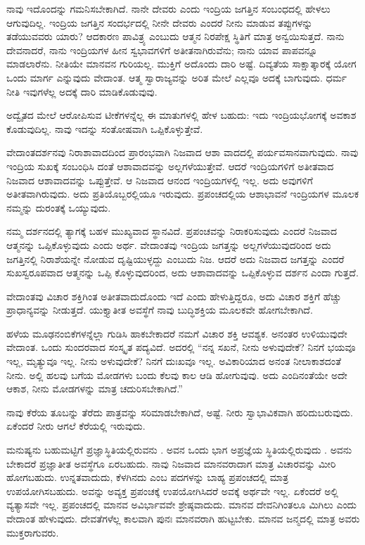 ನಾವು ಇದೊಂದನ್ನು ಗಮನಿಸಬೇಕಾಗಿದೆ. ನಾನೇ ದೇವರು ಎಂದು ಇಂದ್ರಿಯ ಜಗತ್ತಿನ ಸಂಬಂಧದಲ್ಲಿ ಹೇಳಲು ಆಗುವುದಿಲ್ಲ. ಇಂದ್ರಿಯ ಜಗತ್ತಿನ ಸಂದರ್ಭದಲ್ಲಿ ನೀನೇ ದೇವರು ಎಂದರೆ ನೀನು ಮಾಡುವ ತಪ್ಪುಗಳನ್ನು ತಡೆಯುವವರು ಯಾರು? ಆದಕಾರಣ ಪಾವಿತ್ರ್ಯ ಎಂಬುದು ಆತ್ಮನ ನಿರಪೇಕ್ಷ ಸ್ಥಿತಿಗೆ ಮಾತ್ರ ಅನ್ವಯಿಸುತ್ತದೆ. ನಾನು ದೇವನಾದರೆ, ನಾನು ಇಂದ್ರಿಯಗಳ ಹೀನ ಸ್ವಭಾವಗಳಿಗೆ ಅತೀತನಾಗಿರುವೆನು; ನಾನು ಯಾವ ಪಾಪವನ್ನೂ ಮಾಡಲಾರೆನು. ನೀತಿಯೇ ಮಾನವನ ಗುರಿಯಲ್ಲ. ಮುಕ್ತಿಗೆ ಅದೊಂದು ದಾರಿ ಅಷ್ಟೆ. ದಿವ್ಯತೆಯ ಸಾಕ್ಷಾತ್ಕಾರಕ್ಕೆ ಯೋಗ ಒಂದು ಮಾರ್ಗ ಎನ್ನುವುದು ವೇದಾಂತ. ಆತ್ಮ ಸ್ವಾರಾಜ್ಯವನ್ನು ಅರಿತ ಮೇಲೆ ಎಲ್ಲವೂ ಅದಕ್ಕೆ ಬಾಗುವುದು. ಧರ್ಮ ನೀತಿ ಇವುಗಳೆಲ್ಲ ಅದಕ್ಕೆ ದಾರಿ ಮಾಡಿಕೊಡುವುವು.

ಅದ್ವೈತದ ಮೇಲೆ ಆರೋಪಿಸುವ ಟೀಕೆಗಳನ್ನೆಲ್ಲ ಈ ಮಾತುಗಳಲ್ಲಿ ಹೇಳ ಬಹುದು: ಇದು ಇಂದ್ರಿಯಭೋಗಕ್ಕೆ ಅವಕಾಶ ಕೊಡುವುದಿಲ್ಲ. ನಾವು ಇದನ್ನು ಸಂತೋಷವಾಗಿ ಒಪ್ಪಿಕೊಳ್ಳುತ್ತೇವೆ.

ವೇದಾಂತದರ್ಶನವು ನಿರಾಶಾವಾದದಿಂದ ಪ್ರಾರಂಭವಾಗಿ ನಿಜವಾದ ಆಶಾ ವಾದದಲ್ಲಿ ಪರ್ಯವಸಾನವಾಗುವುದು. ನಾವು ಇಂದ್ರಿಯ ಸುಖಕ್ಕೆ ಸಂಬಂಧಿಸಿ ದಂತೆ ಆಶಾವಾದವನ್ನು ಅಲ್ಲಗಳೆಯುತ್ತೇವೆ. ಆದರೆ ಇಂದ್ರಿಯಗಳಿಗೆ ಅತೀತವಾದ ನಿಜವಾದ ಆಶಾವಾದವನ್ನು ಒಪ್ಪುತ್ತೇವೆ. ಆ ನಿಜವಾದ ಆನಂದ ಇಂದ್ರಿಯಗಳಲ್ಲಿ ಇಲ್ಲ. ಅದು ಅವುಗಳಿಗೆ ಅತೀತವಾಗಿರುವುದು. ಅದು ಪ್ರತಿಯೊಬ್ಬರಲ್ಲಿಯೂ ಇರುವುದು. ಪ್ರಪಂಚದಲ್ಲಿಯ ಆಶಾಭಾವನೆ ಇಂದ್ರಿಯಗಳ ಮೂಲಕ ನಮ್ಮನ್ನು ದುರಂತಕ್ಕೆ ಒಯ್ಯುವುದು.

ನಮ್ಮ ದರ್ಶನದಲ್ಲಿ ತ್ಯಾಗಕ್ಕೆ ಬಹಳ ಮುಖ್ಯವಾದ ಸ್ಥಾನವಿದೆ. ಪ್ರಪಂಚವನ್ನು ನಿರಾಕರಿಸುವುದು ಎಂದರೆ ನಿಜವಾದ ಆತ್ಮನನ್ನು ಒಪ್ಪಿಕೊಳ್ಳುವುದು ಎಂದು ಅರ್ಥ. ವೇದಾಂತವು ಇಂದ್ರಿಯ ಜಗತ್ತನ್ನು ಅಲ್ಲಗಳೆಯುವುದರಿಂದ ಅದು ಜಗತ್ತಿನಲ್ಲಿ ನಿರಾಶೆಯನ್ನೇ ನೋಡುವ ದೃಷ್ಟಿಯುಳ್ಳದ್ದು ಎಂಬುದು ನಿಜ. ಆದರೆ ಅದು ನಿಜವಾದ ಜಗತ್ತನ್ನು ಎಂದರೆ ಸುಖಸ್ವರೂಪವಾದ ಆತ್ಮನನ್ನು ಒಪ್ಪಿ ಕೊಳ್ಳುವುದರಿಂದ, ಅದು ಆಶಾವಾದವನ್ನು ಒಪ್ಪಿಕೊಳ್ಳುವ ದರ್ಶನ ಎಂದಾ ಗುತ್ತದೆ.

ವೇದಾಂತವು ವಿಚಾರ ಶಕ್ತಿಗಿಂತ ಅತೀತವಾದುದೊಂದು ಇದೆ ಎಂದು ಹೇಳುತ್ತಿದ್ದರೂ, ಅದು ವಿಚಾರ ಶಕ್ತಿಗೆ ಹೆಚ್ಚು ಪ್ರಾಧಾನ್ಯವನ್ನು ನೀಡುತ್ತದೆ. ಯುಕ್ತ್ಯಾತೀತ ಅವಸ್ಥೆಗೆ ನಾವು ಬುದ್ಧಿಶಕ್ತಿಯ ಮೂಲಕವೇ ಹೋಗಬೇಕಾಗಿದೆ.

ಹಳೆಯ ಮೂಢನಂಬಿಕೆಗಳನ್ನೆಲ್ಲಾ ಗುಡಿಸಿ ಹಾಕಬೇಕಾದರೆ ನಮಗೆ ವಿಚಾರ ಶಕ್ತಿ ಆವಶ್ಯಕ. ಅನಂತರ ಉಳಿಯುವುದೇ ವೇದಾಂತ. ಒಂದು ಸುಂದರವಾದ ಸಂಸ್ಕೃತ ಪದ್ಯವಿದೆ. ಅದರಲ್ಲಿ “ನನ್ನ ಸಖನೆ, ನೀನು ಅಳುವುದೇಕೆ? ನಿನಗೆ ಭಯವೂ ಇಲ್ಲ, ಮೃತ್ಯುವೂ ಇಲ್ಲ. ನೀನು ಅಳುವುದೇಕೆ? ನಿನಗೆ ದುಃಖವೂ ಇಲ್ಲ. ಅವಿಕಾರಿಯಾದ ಅನಂತ ನೀಲಾಕಾಶದಂತೆ ನೀನು. ಅಲ್ಲಿ ಹಲವು ಬಗೆಯ ಮೋಡಗಳು ಬಂದು ಕೆಲವು ಕಾಲ ಆಡಿ ಹೋಗುವುವು. ಅದು ಎಂದಿನಂತೆಯೇ ಅದೇ ಆಕಾಶ, ನೀನು ಮೋಡಗಳನ್ನು ಮಾತ್ರ ಚದುರಿಸಬೇಕಾಗಿದೆ.”

ನಾವು ಕೆರೆಯ ತೂಬನ್ನು ತೆರೆದು ಪಾತ್ರವನ್ನು ಸರಿಮಾಡಬೇಕಾಗಿದೆ, ಅಷ್ಟೆ. ನೀರು ಸ್ವಾಭಾವಿಕವಾಗಿ ಹರಿದುಬರುವುದು. ಏಕೆಂದರೆ ನೀರು ಆಗಲೆ ಕೆರೆಯಲ್ಲಿ ಇರುವುದು.

ಮನುಷ್ಯನು ಬಹುಮಟ್ಟಿಗೆ ಪ್ರಜ್ಞಾಸ್ಥಿತಿಯಲ್ಲಿರುವನು . ಅವನ ಒಂದು ಭಾಗ ಅಪ್ರಜ್ಞೆಯ ಸ್ಥಿತಿಯಲ್ಲಿರುವುದು . ಅವನು ಬೇಕಾದರೆ ಪ್ರಜ್ಞಾತೀತ ಅವಸ್ಥೆಗೂ  ಏರಬಹುದು. ನಾವು ನಿಜವಾದ ಮಾನವರಾದಾಗ ಮಾತ್ರ ವಿಚಾರವನ್ನು ಮೀರಿ ಹೋಗಬಹುದು. ಉನ್ನತವಾದುದು, ಕೆಳಗಿನದು ಎಂಬ ಪದಗಳನ್ನು ಬಾಹ್ಯ ಪ್ರಪಂಚದಲ್ಲಿ ಮಾತ್ರ ಉಪಯೋಗಿಸಬಹುದು. ಅವನ್ನು ಅವ್ಯಕ್ತ ಪ್ರಪಂಚಕ್ಕೆ ಉಪಯೋಗಿಸಿದರೆ ಅವಕ್ಕೆ ಅರ್ಥವೇ ಇಲ್ಲ. ಏಕೆಂದರೆ ಅಲ್ಲಿ ವ್ಯತ್ಯಾಸವೇ ಇಲ್ಲ. ಪ್ರಪಂಚದಲ್ಲಿ ಮಾನವ ಅವಿರ್ಭಾವವೇ ಶ್ರೇಷ್ಠವಾದುದು. ಮಾನವ ದೇವನಿಗಿಂತಲೂ ಮಿಗಿಲು ಎಂದು ವೇದಾಂತ ಹೇಳುವುದು. ದೇವತೆಗಳೆಲ್ಲ ಕಾಲವಾಗಿ ಪುನಃ ಮಾನವರಾಗಿ ಹುಟ್ಟಬೇಕು. ಮಾನವ ಜನ್ಮದಲ್ಲಿ ಮಾತ್ರ ಅವರು ಮುಕ್ತರಾಗುವರು.

